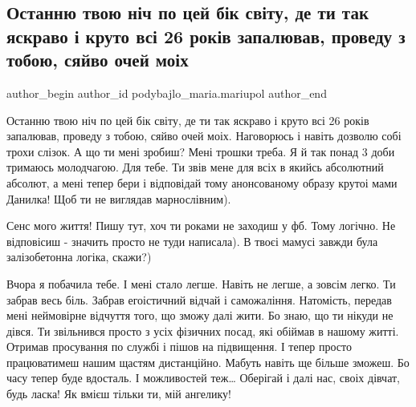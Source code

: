  
 
 
 
 

\subsection{Останню твою ніч по цей бік світу, де ти так яскраво і круто всі 26 років запалював, проведу з тобою, сяйво очей моіх}
\label{sec:05_06_2023.fb.podybajlo_maria.mariupol.1.ostannu_tvoju_nich_po_cej_bik_svitu}

\ifcmt
 author_begin
   author_id podybajlo_maria.mariupol
 author_end
\fi

Останню твою ніч по цей бік світу, де ти так яскраво і круто всі 26 років
запалював, проведу з тобою, сяйво очей моіх. Наговорюсь і навіть дозволю собі
трохи слізок. А що ти мені зробиш? Мені трошки треба. Я й так понад 3 доби
тримаюсь молодчагою. Для тебе. Ти звів мене для всіх в якийсь абсолютний
абсолют, а мені тепер бери і відповідай тому анонсованому образу крутоі мами
Данилка! Щоб ти не виглядав марнослівним).

Сенс мого життя! Пишу тут, хоч ти роками не заходиш у фб. Тому логічно. Не
відповісиш - значить просто не туди написала). В твоєі мамусі завжди була
залізобетонна логіка, скажи?)

Вчора я побачила тебе. І мені стало легше. Навіть не легше, а зовсім легко. Ти
забрав весь біль. Забрав егоістичний відчай і саможаління. Натомість, передав
мені неймовірне відчуття того, що зможу далі жити. Бо знаю, що ти нікуди не
дівся. Ти звільнився просто з усіх фізичних посад, які обіймав в нашому житті.
Отримав просування по службі і пішов на підвищення. І тепер просто працюватимеш
нашим щастям дистанційно. Мабуть навіть ще більше зможеш. Бо часу тепер буде
вдосталь. І можливостей теж… Оберігай і далі нас, своіх дівчат, будь ласка! Як
вмієш тільки ти, мій ангелику! 

